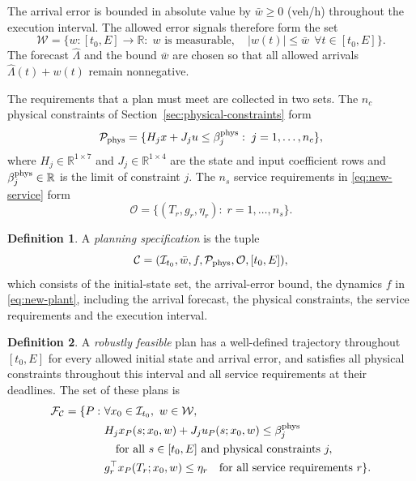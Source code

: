 \documentclass[final]{cas-sc}
\theoremstyle{definition}
\theoremstyle{plain}
\theoremstyle{definition}
\newtheorem{definition}{Definition}
\theoremstyle{plain}
\newcommand{\R}{\mathbb{R}}
\begin{document}
The arrival error is bounded in absolute value by $\bar w\ge0$ (veh/h)
throughout the execution interval. The allowed error signals therefore
form the set
\[
\mathcal W=\{w:[t_0,E]\to\R:\; w\text{ is measurable},\quad
|w(t)|\le\bar w\ \ \forall t\in[t_0,E]\}.
\]
The forecast $\widehat\Lambda$ and the bound $\bar w$ are chosen so
that all allowed arrivals $\widehat\Lambda(t)+w(t)$ remain nonnegative.

The requirements that a plan must meet are collected in two sets. The
$n_c$ physical constraints of Section~\ref{sec:physical-constraints} form
\[
\mathcal P_{\rm phys}=\{H_jx+J_ju\le\beta_j^{\rm phys}:\;j=1,\ldots,n_c\},
\]
where $H_j\in\R^{1\times7}$ and $J_j\in\R^{1\times4}$ are the state
and input coefficient rows and $\beta_j^{\rm phys}\in\R$ is the limit
of constraint $j$. The $n_s$ service requirements in
\eqref{eq:new-service} form
\[
\mathcal O=\{(T_r,g_r,\eta_r):\;r=1,\ldots,n_s\}.
\]

\begin{definition}
\label{def:planning-contract}
A \emph{planning specification} is the tuple
\[
\mathcal C=(\mathcal I_{t_0},\bar w,f,\mathcal P_{\rm phys},\mathcal O,[t_0,E]),
\]
which consists of the initial-state set, the arrival-error bound, the
dynamics $f$ in \eqref{eq:new-plant}, including the
arrival forecast, the physical constraints, the service requirements
and the execution interval.
\end{definition}

\begin{definition}
\label{def:robust-feasibility}
A \emph{robustly feasible} plan has a well-defined trajectory
throughout $[t_0,E]$ for every allowed initial state and arrival error,
and satisfies all physical constraints throughout this interval and all
service requirements at their deadlines. The set of these plans is
\begin{equation}
\begin{aligned}
\mathcal F_{\mathcal C}=\{P:\ &\forall x_0\in\mathcal I_{t_0},\ w\in\mathcal W,\\
&H_jx_P(s;x_0,w)+J_ju_P(s;x_0,w)\le\beta_j^{\rm phys}\\
&\quad\text{for all }s\in[t_0,E]\text{ and physical constraints }j,\\
&g_r^\top x_P(T_r;x_0,w)\le\eta_r\quad
\text{for all service requirements }r\}.
\end{aligned}
\label{eq:benchmark-feasible-set}
\end{equation}
\end{definition}
\end{document}
